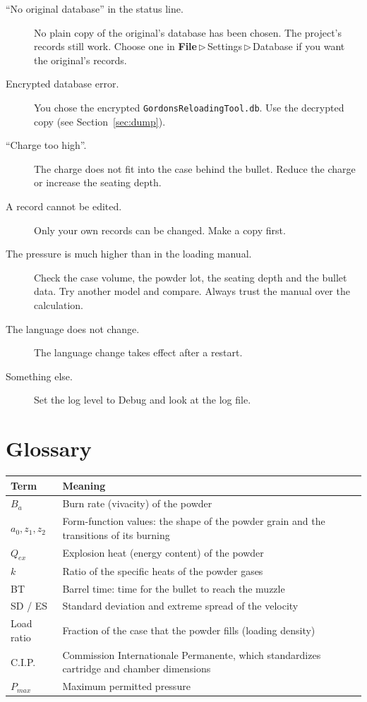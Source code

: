 \documentclass[11pt,a4paper]{article}
\newcommand{\ui}[1]{\textsf{#1}}
\newcommand{\menu}[1]{\textsf{\textbf{#1}}}
\newcommand{\sep}{\,$\triangleright$\,}
\newcommand{\file}[1]{\texttt{#1}}
\begin{document}
\begin{description}
  \item[``No original database'' in the status line.] No plain copy of the original's database has been chosen. The project's records still work. Choose one in
        \menu{File}\sep\ui{Settings}\sep\ui{Database} if you want the original's records.
  \item[Encrypted database error.] You chose the encrypted \file{GordonsReloadingTool.db}. Use the decrypted copy
        (see Section~\ref{sec:dump}).
  \item[``Charge too high''.] The charge does not fit into the case behind the bullet. Reduce the charge or increase the seating depth.
  \item[A record cannot be edited.] Only your own records can be changed. Make a copy first.
  \item[The pressure is much higher than in the loading manual.] Check the case volume, the powder lot, the seating depth and the bullet data. Try another
        model and compare. Always trust the manual over the calculation.
  \item[The language does not change.] The language change takes effect after a restart.
  \item[Something else.] Set the log level to \ui{Debug} and look at the log file.
\end{description}

\section{Glossary}
\begin{tabular}{@{}>{\raggedright\arraybackslash}p{3.2cm}p{11.5cm}@{}}
  \toprule
  Term & Meaning \\
  \midrule
  $B_a$ & Burn rate (vivacity) of the powder \\
  $a_0, z_1, z_2$ & Form-function values: the shape of the powder grain and the transitions of its burning \\
  $Q_{ex}$ & Explosion heat (energy content) of the powder \\
  $k$ & Ratio of the specific heats of the powder gases \\
  BT & Barrel time: time for the bullet to reach the muzzle \\
  SD / ES & Standard deviation and extreme spread of the velocity \\
  Load ratio & Fraction of the case that the powder fills (loading density) \\
  C.I.P. & Commission Internationale Permanente, which standardizes cartridge and chamber dimensions \\
  $P_{max}$ & Maximum permitted pressure \\
  \bottomrule
\end{tabular}
\end{document}
